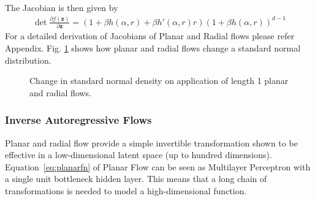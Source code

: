 \documentclass[runningheads]{llncs}
\begin{document}
The Jacobian is then given by
\begin{align}
\det\frac{\partial f(\mathbf{z})}{\partial \mathbf{z}} = \left(1 + \beta h(\alpha,r) + \beta h'(\alpha,r)r\right)(1+\beta h(\alpha,r))^{d-1}
\end{align}
For a detailed derivation of Jacobians of Planar and Radial flows please refer Appendix. Fig. \ref{fig:planarradial} shows how planar and radial flows change a standard normal distribution.

\begin{figure}
	\centering
	\caption{Change in standard normal density on application of length 1 planar and radial flows.}
	\label{fig:planarradial}
\end{figure}

\subsubsection{Inverse Autoregressive Flows} Planar and radial flow provide a simple invertible transformation shown to be effective in a low-dimensional latent space (up to hundred dimensions). Equation~\ref{eq:planarfn} of Planar Flow can be seen as Multilayer Perceptron with a single unit bottleneck hidden layer. This means that a long chain of transformations is needed to model a high-dimensional function. 
\end{document}
